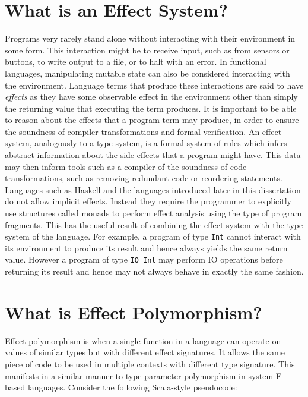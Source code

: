 \documentclass{Report}
\begin{document}
\section{What is an Effect System?}

Programs very rarely stand alone without interacting with their environment in some form. This interaction might be to receive input, such as from sensors or buttons, to write output to a file, or to halt with an error. In functional languages, manipulating mutable state can also be considered interacting with the environment. Language terms that produce these interactions are said to have \textit{effects} as they have some observable effect in the environment other than simply the returning value that executing the term produces. It is important to be able to reason about the effects that a program term may produce, in order to ensure the soundness of compiler transformations and formal verification. An effect system, analogously to a type system, is a formal system of rules which infers abstract information about the side-effects that a program might have. This data may then inform tools such as a compiler of the soundness of code transformations, such as removing redundant code or reordering statements. Languages such as Haskell and the languages introduced later in this dissertation do not allow implicit effects. Instead they require the programmer to explicitly use structures called monads \cite{MoggiMonads} to perform effect analysis using the type of program fragments. This has the useful result of combining the effect system with the type system of the language. For example, a program of type \texttt{Int} cannot interact with its environment to produce its result and hence always yields the same return value. However a program of type \texttt{IO Int} may perform IO operations before returning its result and hence may not always behave in exactly the same fashion.

\section{What is Effect Polymorphism?}


Effect polymorphism is when a single function in a language can operate on values of similar types but with different effect signatures. It allows the same piece of code to be used in multiple contexts with different type signature. This manifests in a similar manner to type parameter polymorphism in system-F-based languages. Consider the following Scala-style pseudocode:
\renewcommand\o[1]{\textcolor{orange}{#1}}
\newcommand\bl[1]{\textcolor{blue}{#1}}
\newcommand\gr[1]{\textcolor{DarkGreen}{#1}}
\newcommand\pl[1]{\textcolor{purple}{#1}}
\newcommand\cy[1]{\textcolor{cyan}{#1}}
\newcommand\red[1]{\textcolor{red}{#1}}
\end{document}
